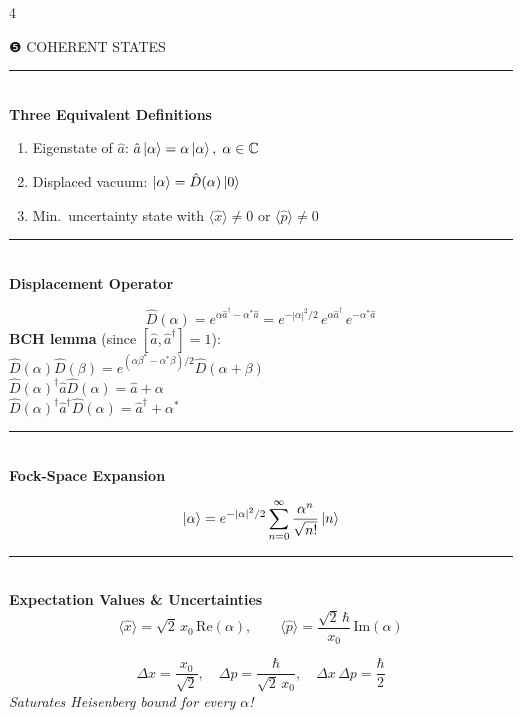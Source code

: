 \documentclass[9pt,landscape]{article}
\newcommand{\A}{\hat{a}}
\newcommand{\Ad}{\hat{a}^{\dagger}}
\newcommand{\x}{\hat{x}}
\newcommand{\p}{\hat{p}}
\newcommand{\D}[1]{\hat{D}(#1)}
\newcommand{\xz}{x_0}                     %
\newcommand{\mysec}[1]{%
  \vspace{3pt}%
  {\color{midviolet}\rule{\linewidth}{0.6pt}}\\[-1pt]%
  {\bfseries\color{deepviolet}\small #1}\\[0.5pt]%
}
\begin{document}
\begin{multicols}{4}

\begin{tcolorbox}[sectionbox]
  \centering ❺\; COHERENT STATES
\end{tcolorbox}

\mysec{Three Equivalent Definitions}
\begin{tcolorbox}[greenbox]
\begin{enumerate}[leftmargin=*, itemsep=2pt, topsep=0pt, label=\textbf{\arabic*.}]
  \item Eigenstate of $\A$:\; $\A\ket{\alpha}=\alpha\ket{\alpha},\;\alpha\in\mathbb{C}$
  \item Displaced vacuum:\; $\ket{\alpha}=\D{\alpha}\ket{0}$
  \item Min.\ uncertainty state with $\langle\x\rangle\neq 0$ or $\langle\p\rangle\neq 0$
\end{enumerate}
\end{tcolorbox}

\mysec{Displacement Operator}
\begin{tcolorbox}[greenbox]
\[
  \D{\alpha} = e^{\alpha\Ad-\alpha^*\A}
             = e^{-|\alpha|^2/2}\,e^{\alpha\Ad}\,e^{-\alpha^*\A}
\]
\textbf{BCH lemma} (since $[\A,\Ad]=1$):\\[2pt]
$\D{\alpha}\D{\beta} = e^{(\alpha\beta^*-\alpha^*\beta)/2}\D{\alpha+\beta}$\\[2pt]
$\D{\alpha}^\dagger\A\D{\alpha} = \A+\alpha$\\
$\D{\alpha}^\dagger\Ad\D{\alpha} = \Ad+\alpha^*$
\end{tcolorbox}

\mysec{Fock-Space Expansion}
\begin{tcolorbox}[greenbox]
\[
  \ket{\alpha} = e^{-|\alpha|^2/2}\sum_{n=0}^{\infty}\frac{\alpha^n}{\sqrt{n!}}\ket{n}
\]
\end{tcolorbox}

\mysec{Expectation Values \& Uncertainties}
\[
  \langle\x\rangle = \sqrt{2}\,\xz\,\mathrm{Re}(\alpha),\qquad
  \langle\p\rangle = \frac{\sqrt{2}\,\hbar}{\xz}\,\mathrm{Im}(\alpha)
\]
\begin{tcolorbox}[greenbox]
\[
  \Delta x = \frac{\xz}{\sqrt{2}},\quad
  \Delta p = \frac{\hbar}{\sqrt{2}\,\xz},\quad
  \boxed{\Delta x\,\Delta p = \frac{\hbar}{2}}
\]
\emph{Saturates Heisenberg bound for every $\alpha$!}
\end{tcolorbox}


\end{multicols}
\end{document}
